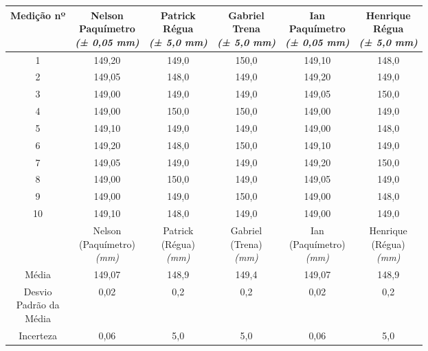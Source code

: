 \documentclass{article}
\begin{document}
\begin{table}[h!]
\centering
\begin{tabular}{c c c c c c }
\toprule
Medição nº & \shortstack{Nelson\\Paquímetro\\\textit{(± 0,05 mm)}} & \shortstack{Patrick\\Régua\\\textit{(± 5,0 mm)}} & \shortstack{Gabriel\\Trena\\\textit{(± 5,0 mm)}} & \shortstack{Ian\\Paquímetro\\\textit{(± 0,05 mm)}} & \shortstack{Henrique\\Régua\\\textit{(± 5,0 mm)}}\\
\midrule
1 & 149,20 & 149,0 & 150,0 & 149,10 & 148,0\\
2 & 149,05 & 148,0 & 149,0 & 149,20 & 149,0\\
3 & 149,00 & 149,0 & 149,0 & 149,05 & 150,0\\
4 & 149,00 & 150,0 & 150,0 & 149,00 & 149,0\\
5 & 149,10 & 149,0 & 149,0 & 149,00 & 148,0\\
6 & 149,20 & 148,0 & 150,0 & 149,10 & 149,0\\
7 & 149,05 & 149,0 & 149,0 & 149,20 & 150,0\\
8 & 149,00 & 150,0 & 149,0 & 149,05 & 149,0\\
9 & 149,00 & 149,0 & 150,0 & 149,00 & 148,0\\
10 & 149,10 & 148,0 & 149,0 & 149,00 & 149,0\\
\midrule
&\shortstack{Nelson\\(Paquímetro)\\\textit{(mm)}} & \shortstack{Patrick\\(Régua)\\\textit{(mm)}} & \shortstack{Gabriel\\(Trena)\\\textit{(mm)}} & \shortstack{Ian\\(Paquímetro)\\\textit{(mm)}} & \shortstack{Henrique\\(Régua)\\\textit{(mm)}}\\
\midrule
Média & 149,07 & 148,9 & 149,4 & 149,07 & 148,9\\[3pt]
\shortstack{Desvio\\Padrão da\\Média} & 0,02 & 0,2 & 0,2 & 0,02 & 0,2\\[3pt]
Incerteza & 0,06 & 5,0 & 5,0 & 0,06 & 5,0\\
\bottomrule
\end{tabular}
\end{table}
\end{document}

